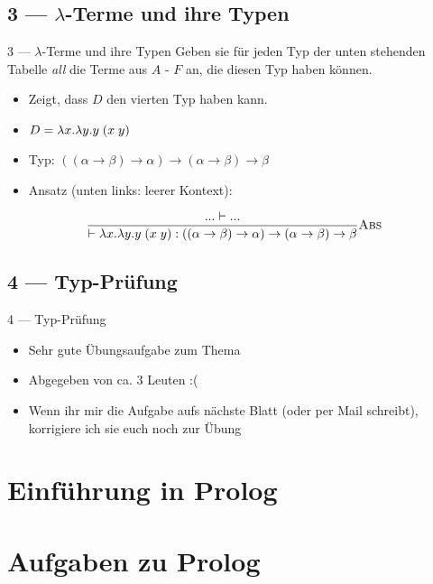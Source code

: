 \documentclass{beamer}
\begin{document}
\subsection{3 --- $\lambda$-Terme und ihre Typen}

\begin{frame}{3 --- $\lambda$-Terme und ihre Typen}
	Geben sie für jeden Typ der unten stehenden Tabelle \emph{all} die Terme aus $A$ - $F$ an, die diesen Typ haben können.

	\begin{itemize}
		\item Zeigt, dass $D$ den vierten Typ haben kann.
		\item $D = \abs{x}{\abs{y}{\liin{y}{\lii{x}{y}}}}$
		\item Typ: $((\alpha \to \beta) \to \alpha) \to (\alpha \to \beta) \to \beta$
		\pause
		\item Ansatz (unten links: leerer Kontext):
	\end{itemize}

	\begin{equation*}
		\typeRule{Abs}{
			... \vdash ...
		}{
			\vdash \abs{x}{\abs{y}{\liin{y}{\lii{x}{y}}}} : ((\alpha \to \beta) \to \alpha) \to (\alpha \to \beta) \to \beta
		}
	\end{equation*}
\end{frame}

\subsection{4 --- Typ-Prüfung}

\begin{frame}{4 --- Typ-Prüfung}
	\begin{itemize}
		\item Sehr gute Übungsaufgabe zum Thema
		\item Abgegeben von ca. 3 Leuten :(
		\item Wenn ihr mir die Aufgabe aufs nächste Blatt (oder per Mail schreibt), korrigiere ich sie euch noch zur Übung
	\end{itemize}
\end{frame}

\section{Einführung in Prolog}


\section{Aufgaben zu Prolog}

\end{document}
